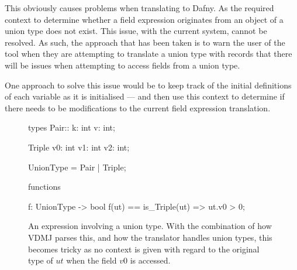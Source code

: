 \documentclass{entcs}
\begin{document}
This obviously causes problems when translating to Dafny. As the required context to determine whether a field expression originates from an object of a union type does not exist. This issue, with the current system, cannot be resolved. As such, the approach that has been taken is to warn the user of the tool when they are attempting to translate a union type with records that there will be issues when attempting to access fields from a union type.

One approach to solve this issue would be to keep track of the initial definitions of each variable as it is initialised --- and then use this context to determine if there needs to be modifications to the current field expression translation.

\begin{figure}[h]
	\begin{center}
        \begin{vdmsl}
types 
Pair::
    k: int 
    v: int;

Triple
    v0: int
    v1: int
    v2: int;

UnionType = Pair | Triple;

functions 

f: UnionType -> bool
f(ut) == is_Triple(ut) => ut.v0 > 0;
        \end{vdmsl}
		\caption{An expression involving a union type. With the combination of how VDMJ parses this, and how the translator handles union types, this becomes tricky as no context is given with regard to the original type of $ut$ when the field $v0$ is accessed.}\label{fig:bad_field_expressions}
	\end{center}
\end{figure}
\end{document}
